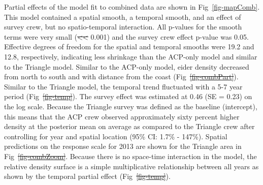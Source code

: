 \documentclass[
  10pt,
  letterpaper,
]{article}
\makeatletter
\providecommand{\DIFaddtex}[1]{{\protect\color{blue}\uwave{#1}}} %
\providecommand{\DIFdeltex}[1]{{\protect\color{red}\sout{#1}}} %
\providecommand{\DIFaddbegin}{} %
\providecommand{\DIFaddend}{} %
\providecommand{\DIFdelbegin}{} %
\providecommand{\DIFdelend}{} %
\providecommand{\DIFadd}[1]{\texorpdfstring{\DIFaddtex{#1}}{#1}} %
\providecommand{\DIFdel}[1]{\texorpdfstring{\DIFdeltex{#1}}{}} %
\providecommand{\DIFscaledelfig}{0.5}
\newlength{\DIFdelgraphicswidth} %
\newlength{\DIFdelgraphicsheight} %
\providecommand{\DIFaddincludegraphics}[2][]{{\color{blue}\fbox{\DIFOincludegraphics[#1]{#2}}}} %
\providecommand{\DIFdelincludegraphics}[2][]{%
\sbox{\DIFdelgraphicsbox}{\DIFOincludegraphics[#1]{#2}}%
\settoboxwidth{\DIFdelgraphicswidth}{\DIFdelgraphicsbox} %
\settoboxtotalheight{\DIFdelgraphicsheight}{\DIFdelgraphicsbox} %
\scalebox{\DIFscaledelfig}{%
\parbox[b]{\DIFdelgraphicswidth}{\usebox{\DIFdelgraphicsbox}\\[-\baselineskip] \rule{\DIFdelgraphicswidth}{0em}}\llap{\resizebox{\DIFdelgraphicswidth}{\DIFdelgraphicsheight}{%
\setlength{\unitlength}{\DIFdelgraphicswidth}%
\begin{picture}(1,1)%
\thicklines\linethickness{2pt} %
{\color[rgb]{1,0,0}\put(0,0){\framebox(1,1){}}}%
{\color[rgb]{1,0,0}\put(0,0){\line( 1,1){1}}}%
{\color[rgb]{1,0,0}\put(0,1){\line(1,-1){1}}}%
\end{picture}%
}\hspace*{3pt}}} %
} %
\DeclareRobustCommand{\DIFaddbegin}{\DIFOaddbegin \let\includegraphics\DIFaddincludegraphics} %
\DeclareRobustCommand{\DIFaddend}{\DIFOaddend \let\includegraphics\DIFOincludegraphics} %
\DeclareRobustCommand{\DIFdelbegin}{\DIFOdelbegin \let\includegraphics\DIFdelincludegraphics} %
\DeclareRobustCommand{\DIFdelend}{\DIFOaddend \let\includegraphics\DIFOincludegraphics} %
\let\sout@orig\sout %
\renewcommand{\sout}[1]{\ifmmode\text{\sout@orig{\ensuremath{#1}}}\else\sout@orig{#1}\fi} %
\makeatother
\begin{document}
Partial effects of the model fit to combined data are shown in
Fig~\ref{fig-mapComb}. This model contained a spatial smooth, a temporal
smooth, and an effect of survey crew, but no spatio-temporal
interaction. All p-values for the smooth terms were very small
(\DIFdelbegin \DIFdel{\textless\textless{} }\DIFdelend \DIFaddbegin \DIFadd{< }\DIFaddend 0.001) and the survey crew effect p-value was
0.05. Effective degrees of freedom for the spatial and temporal smooths
were 19.2 and 12.8, respectively, indicating less shrinkage than the
ACP-only model and similar to the Triangle model. Similar to the
ACP-only model, eider density decreased from north to south and with
distance from the coast (Fig~\DIFdelbegin \DIFdel{\ref{fig-combPart}}\DIFdelend \DIFaddbegin \DIFadd{\ref{fig-mapComb}A}\DIFaddend ). Similar to the
Triangle model, the temporal trend fluctuated with a 5-7 year period
(Fig~\DIFdelbegin \DIFdel{\ref{fig-temp}}\DIFdelend \DIFaddbegin \DIFadd{\ref{fig-mapComb}B}\DIFaddend ). The survey effect was estimated at 0.46 (SE =
0.23) on the log scale. Because the Triangle survey was defined as the
baseline (intercept), this means that the ACP crew observed
approximately sixty percent higher density at the posterior mean on
average as compared to the Triangle crew after controlling for year and
spatial location (95\% CI: 1.7\% - 147\%). Spatial predictions on the
response scale for 2013 are shown for the Triangle area in
Fig~\DIFdelbegin \DIFdel{\ref{fig-combZoom}}\DIFdelend \DIFaddbegin \DIFadd{\ref{fig-mapComb}C}\DIFaddend . Because there is no space-time interaction in
the model, the relative density surface is a simple multiplicative
relationship between all years as shown by the temporal partial effect
(Fig~\DIFdelbegin \DIFdel{\ref{fig-temp}}\DIFdelend \DIFaddbegin \DIFadd{\ref{fig-mapComb}B}\DIFaddend ).
\end{document}
